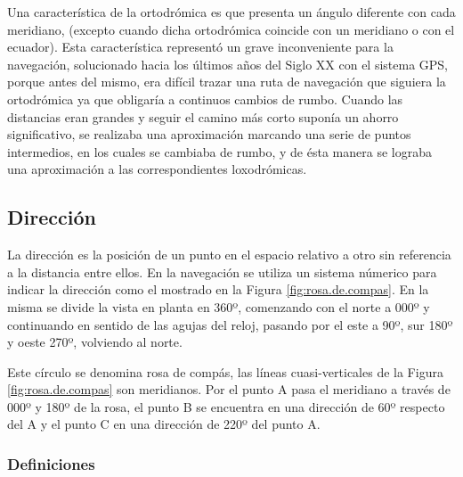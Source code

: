 \documentclass[a4paper,12pt,twoside]{article}
\begin{document}
Una característica de la ortodrómica es que presenta un ángulo diferente con cada meridiano, (excepto cuando dicha ortodrómica coincide con un meridiano o con el ecuador). Esta característica representó un grave inconveniente para la navegación, solucionado hacia los últimos años del Siglo XX con el sistema GPS, porque antes del mismo, era difícil trazar una ruta de navegación que siguiera la ortodrómica ya que obligaría a continuos cambios de rumbo. Cuando las distancias eran grandes y seguir el camino más corto suponía un ahorro significativo, se realizaba una aproximación marcando una serie de puntos intermedios, en los cuales se cambiaba de rumbo, y de ésta manera se lograba una aproximación a las correspondientes loxodrómicas.

\subsection{Direcci\'on}
\label{sec:direccion}

La direcci\'on es la posici\'on de un punto en el espacio relativo a otro sin referencia a la distancia entre ellos. En la navegaci\'on se utiliza un sistema n\'umerico para indicar la direcci\'on como el mostrado en la Figura \ref{fig:rosa.de.compas}. En la misma se divide la vista en planta en 360º, comenzando con el norte a 000º y continuando en sentido de las agujas del reloj, pasando por el este a 90º, sur 180º y oeste 270º, volviendo al norte.

Este c\'irculo se denomina rosa de comp\'as, las l\'ineas cuasi-verticales de la Figura \ref{fig:rosa.de.compas} son meridianos. Por el punto A pasa el meridiano a trav\'es de 000º y 180º de la rosa, el punto B se encuentra en una direcci\'on de 60º respecto del A y el punto C en una direcci\'on de 220º del punto A.

\subsubsection{Definiciones}
\label{sec:definiciones.navegacion}
\end{document}
